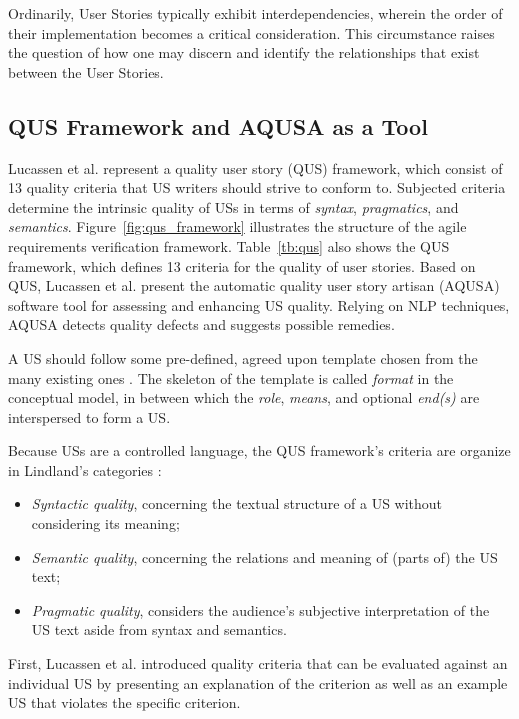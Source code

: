 Ordinarily, User Stories typically exhibit interdependencies, wherein the order of their implementation becomes a critical consideration. This circumstance raises the question of how one may discern and identify the relationships that exist between the User Stories.

\subsection{QUS Framework and AQUSA as a Tool}\label{quality-framework}
Lucassen et al. \cite{lucassen2016improving} represent a quality user story (QUS) framework, which consist of 13 quality criteria that US writers should strive to conform to. Subjected criteria determine the intrinsic quality of USs in terms of \emph{syntax}, \emph{pragmatics}, and \emph{semantics}. Figure~\ref{fig:qus_framework} illustrates the structure of the agile requirements verification framework. Table~\ref{tb:qus} also shows the QUS framework, which defines 13 criteria for the quality of user stories. Based on QUS, Lucassen et al. present the automatic quality user story artisan (AQUSA) software tool for assessing and enhancing US quality. Relying on NLP techniques, AQUSA detects quality defects and suggests possible remedies.

A US should follow some pre-defined, agreed upon template chosen from the many existing ones \cite{wautelet2014unifying}. The skeleton of the template is called \emph{format} in the conceptual model, in between which the \emph{role}, \emph{means}, and optional \emph{end(s)} are interspersed to form a US. 

Because USs are a controlled language, the QUS framework’s criteria are organize in Lindland’s categories \cite{lindland1994understanding}:

\begin{itemize}
\item\emph{ Syntactic quality}, concerning the textual structure of a US without considering its meaning;
\item\emph{Semantic quality}, concerning the relations and meaning of (parts of) the US text;
\item\emph{Pragmatic quality}, considers the audience’s subjective interpretation of the US text aside from syntax and semantics.
\end{itemize}

First, Lucassen et al. introduced quality criteria that can be evaluated against an individual US by presenting an explanation of the criterion as well as an example US that violates the specific criterion.


